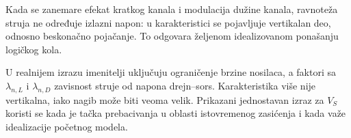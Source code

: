 Kada se zanemare efekat kratkog kanala i modulacija dužine kanala, ravnoteža struja ne određuje izlazni napon: u karakteristici se pojavljuje vertikalan deo, odnosno beskonačno pojačanje. To odgovara željenom idealizovanom ponašanju logičkog kola.

U realnijem izrazu imenitelji uključuju ograničenje brzine nosilaca, a faktori sa $\lambda_{n,L}$ i $\lambda_{n,D}$ zavisnost struje od napona drejn–sors. Karakteristika više nije vertikalna, iako nagib može biti veoma velik. Prikazani jednostavan izraz za $V_S$ koristi se kada je tačka prebacivanja u oblasti istovremenog zasićenja i kada važe idealizacije početnog modela.
